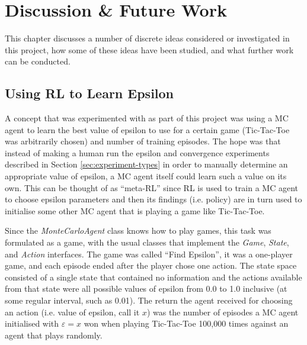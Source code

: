 \documentclass[11pt,a4paper]{report}
\begin{document}
\chapter{Discussion \& Future Work}

This chapter discusses a number of discrete ideas considered or investigated in this project, how some of these ideas have been studied, and what further work can be conducted.


\section{Using RL to Learn Epsilon}

A concept that was experimented with as part of this project was using a MC agent to learn the best value of epsilon to use for a certain game (Tic-Tac-Toe was arbitrarily chosen) and number of training episodes. The hope was that instead of making a human run the epsilon and convergence experiments described in Section \ref{sec:experiment-types} in order to manually determine an appropriate value of epsilon, a MC agent itself could learn such a value on its own. This can be thought of as ``meta-RL'' since RL is used to train a MC agent to choose epsilon parameters and then its findings (i.e. policy) are in turn used to initialise some other MC agent that is playing a game like Tic-Tac-Toe.

Since the \emph{MonteCarloAgent} class knows how to play games, this task was formulated as a game, with the usual classes that implement the \emph{Game}, \emph{State}, and \emph{Action} interfaces. The game was called ``Find Epsilon'', it was a one-player game, and each episode ended after the player chose one action. The state space consisted of a single state that contained no information and the actions available from that state were all possible values of epsilon from 0.0 to 1.0 inclusive (at some regular interval, such as 0.01). The return the agent received for choosing an action (i.e. value of epsilon, call it $x$) was the number of episodes a MC agent initialised with $\varepsilon = x$ won when playing Tic-Tac-Toe 100,000 times against an agent that plays randomly.
\end{document}

